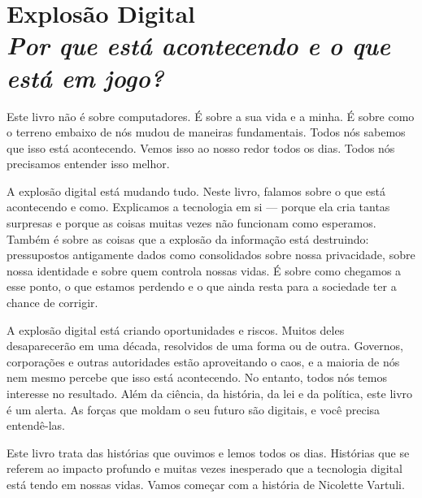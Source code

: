 \chapter[Explosão Digital]{Explosão Digital\\\large\textit{Por que está
acontecendo e o que está em jogo?}}
\label{cap1:exp-dig}

Este livro não é sobre computadores. É sobre a sua vida e a minha. É sobre como
o terreno embaixo de nós mudou de maneiras fundamentais. Todos nós sabemos que
isso está acontecendo. Vemos isso ao nosso redor todos os dias. Todos nós
precisamos entender isso melhor.

A explosão digital está mudando tudo. Neste livro, falamos sobre o que está
acontecendo e como. Explicamos a tecnologia em si --- porque ela cria tantas 
surpresas e porque as coisas muitas vezes não funcionam como esperamos. Também 
é sobre as coisas que a explosão da informação está destruindo: pressupostos
antigamente dados como consolidados sobre nossa privacidade, sobre nossa
identidade e sobre quem controla nossas vidas. É sobre como chegamos a esse
ponto, o que estamos perdendo e o que ainda resta para a sociedade ter a chance
de corrigir.

A explosão digital está criando oportunidades e riscos. Muitos deles 
desaparecerão em uma década, resolvidos de uma forma ou de outra. Governos, 
corporações e outras autoridades estão aproveitando o caos, e a maioria de nós 
nem mesmo percebe que isso está acontecendo. No entanto, todos nós temos
interesse no resultado. Além da ciência, da história, da lei e da política, este
livro é um alerta. As forças que moldam o seu futuro são digitais, e você 
precisa entendê-las.

Este livro trata das histórias que ouvimos e lemos todos os dias. Histórias que 
se referem ao impacto profundo e muitas vezes inesperado que a tecnologia 
digital está tendo em nossas vidas. Vamos começar com a história de Nicolette 
Vartuli.

